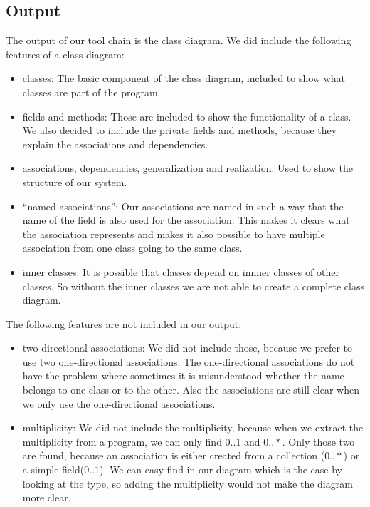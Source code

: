 \documentclass[a4paper,11pt]{article}
\begin{document}
	\subsection{Output}
		The output of our tool chain is the class diagram.
		We did include the following features of a class diagram:
		\begin{itemize}
			\item classes: The basic component of the class diagram, included to show what classes are part of the program.
			\item fields and methods: Those are included to show the functionality of a class. We also decided to include the private fields and methods, because they explain the associations and dependencies.
			\item associations, dependencies, generalization and realization: Used to show the structure of our system.
			\item ``named associations'': Our associations are named in such a way that the name of the field is also used for the association. This makes it clears what the association represents and makes it also possible to have multiple association from one class going to the same class.
			\item inner classes: It is possible that classes depend on innner classes of other classes. So without the inner classes we are not able to create a complete class diagram. %
		\end{itemize}
		
		The following features are not included in our output:
		\begin{itemize}
			\item two-directional associations: We did not include those, because we prefer to use two one-directional associations. The one-directional associations do not have the problem where sometimes it is misunderstood whether the name belongs to one class or to the other. Also the associations are still clear when we only use the one-directional associations.
			\item multiplicity: We did not include the multiplicity, because when we extract the multiplicity from a program, we can only find $0..1$ and $0..*$.
			Only those two are found, because an association is either created from a collection ($0..*$) or a simple field($0..1$).
			We can easy find in our diagram which is the case by looking at the type, so adding the multiplicity would not make the diagram more clear.
		\end{itemize}
	
\end{document}
